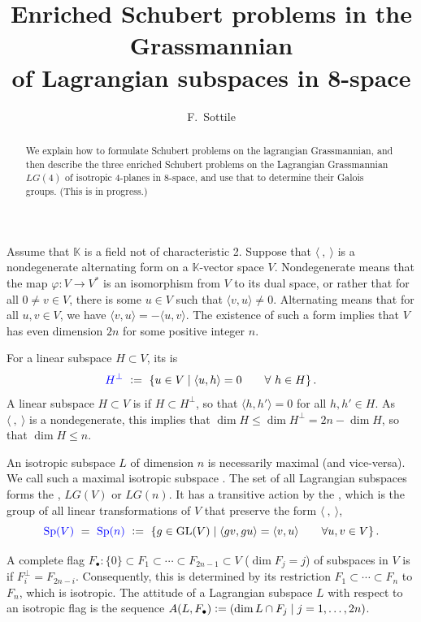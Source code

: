 \documentclass[12pt]{amsart}
\title{Enriched Schubert problems in the Grassmannian  \\ of Lagrangian subspaces in 8-space}
\author{F.~Sottile}
\theoremstyle{remark}
\newcommand{\GL}{\textrm{GL}}
\newcommand{\Sp}{\textrm{Sp}}
\newcommand{\Fdot}{F_\bullet}
\newcommand{\LG}{\textit{LG}}
\newcommand{\KK}{{\mathbb K}}
\newcommand{\defcolor}[1]{{\color{blue}#1}}
\newcommand{\demph}[1]{\defcolor{{\sl #1}}}
\begin{document}
\begin{abstract}
  We explain how to formulate Schubert problems on the lagrangian Grassmannian, and then
  describe the three enriched Schubert problems on the Lagrangian Grassmannian $\LG(4)$ of isotropic 4-planes in 8-space,
  and use that to determine their Galois groups. (This is in progress.)
\end{abstract}
\maketitle



Assume that $\KK$ is a field not of characteristic 2.
Suppose that $\langle\:,\:\rangle$ is a nondegenerate alternating form on a $\KK$-vector space $V$.
Nondegenerate means that the map $\varphi\colon V\to V^*$ is an isomorphism from $V$ to its dual space,
or rather that for all $0\neq v\in V$, there is some $u\in V$ such that $\langle v, u\rangle\neq 0$.
Alternating means that for all $u,v\in V$, we have $\langle v,u\rangle = - \langle u,v\rangle$.
The existence of such a form implies that $V$ has even dimension $2n$ for some positive integer $n$.

For a linear subspace $H\subset V$, its \demph{annihilator} is
\[
    \defcolor{H^\perp} \ \vcentcolon=\ \{u\in V\mid \langle u, h\rangle =0\qquad\forall\ h\in H\}\,.
\]
A linear subspace $H\subset V$ is \demph{isotropic} if $H\subset H^\perp$, so that $\langle h,h'\rangle=0$
for all $h,h'\in H$.
As $\langle\:,\:\rangle$ is a nondegenerate, this implies that $\dim H \leq \dim H^\perp = 2n-\dim H$, so that
$\dim H\leq n$.

An isotropic subspace $L$ of dimension $n$ is necessarily maximal (and vice-versa).
We call such a maximal isotropic subspace \demph{Lagrangian}.
The set of all Lagrangian subspaces forms the \demph{Lagrangian Grassmannian}, \defcolor{$\LG(V)$} or \defcolor{$\LG(n)$}.
It has a transitive action by the \demph{symplectic group}, which is the group of all linear transformations of $V$ that
preserve the form $\langle\:,\:\rangle$,
\[
    \defcolor{\Sp(V)}\ =\ \defcolor{\Sp(n)}\ \vcentcolon=\
    \{ g\in \GL(V) \mid \langle gv, gu\rangle=\langle v, u\rangle\qquad \forall u,v\in V\}\,.
\]

A complete flag $\Fdot\colon \{0\}\subset F_1\subset\dotsb\subset F_{2n-1}\subset V$ ($\dim F_j=j$)
of subspaces in $V$ is \demph{isotropic} if $F_i^\perp=F_{2n-i}$.
Consequently, this is determined by its restriction $F_1\subset\dotsb\subset F_n$ to $F_n$, which is isotropic.
The attitude of a Lagrangian subspace $L$ with respect to an isotropic flag is the sequence
$A(L,\Fdot)\vcentcolon=(\dim L\cap F_j\mid j=1,\dotsc,2n)$.
\end{document}
